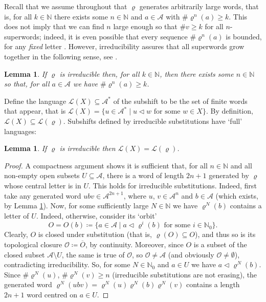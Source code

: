 \documentclass[11pt]{amsart}
\numberwithin{equation}{section}
\theoremstyle{plain}
\newtheorem{lemma}[theorem]{Lemma}
\theoremstyle{definition}
\newcommand{\N}{{\mathbb N}}
\newcommand{\mc}{\mathcal}
\newcommand{\A}{\mc A}
\newcommand{\sub}{\varrho}
\newcommand{\lang}{\mathcal{L}}
\begin{document}
Recall that we assume throughout that \(\sub\) generates arbitrarily large words, that is, for all \(k \in \N\) there exists some \(n \in \N\) and \(a \in \A\) with \(\# \sub^n(a) \geq k\). This does not imply that we can find \(n\) large enough so that \(\# v \geq k\) for all \(n\)-superwords; indeed, it is even possible that every sequence \(\# \sub^n(a)\) is bounded, for any \emph{fixed} letter \cite[Example 3.12]{MRW25}. However, irreducibility assures that all superwords grow together in the following sense, see \cite[Proposition 4.27]{MRW25}.

\begin{lemma}\label{lem:irreducible=>letter growth}
If \(\sub\) is irreducible then, for all \(k \in \N\), then there exists some \(n \in \N\) so that, for all \(a \in \A\) we have \(\# \sub^n(a) \geq k\).
\end{lemma}

Define the language \(\lang(X) \subseteq \A^\ast\) of the subshift to be the set of finite words that appear, that is \(\lang(X) = \{u \in \A^\ast \mid u \triangleleft w \text{ for some } w \in X\}\). By definition, \(\lang(X) \subseteq \lang(\sub)\). Subshifts defined by irreducible substitutions have `full' languages:

\begin{lemma}
If \(\sub\) is irreducible then \(\lang(X) = \lang(\sub)\).
\end{lemma}

\begin{proof}
A compactness argument \cite[Proposition 3.16]{MRW25} shows it is sufficient that, for all \(n \in \N\) and all non-empty open subsets \(U \subseteq \A\), there is a word of length \(2n+1\) generated by \(\sub\) whose central letter is in \(U\). This holds for irreducible substitutions. Indeed, first take any generated word \(u b v \in \A^{2n+1}\), where \(u\), \(v \in \A^n\) and \(b \in \A\) (which exists, by Lemma \ref{lem:irreducible=>letter growth}). Now, for some sufficiently large \(N \in \N\) we have \(\sub^N(b)\) contains a letter of \(U\). Indeed, otherwise, consider its `orbit'
\[
O = O(b) \coloneqq \{ a \in \A \mid a \triangleleft \sub^i(b) \text{ for some } i \in \N_0\} .
\]
Clearly, \(O\) is closed under substitution (that is, \(\sub(O) \subseteq O\)), and thus so is its topological closure \(\mathcal{O} \coloneqq \overline{O}\), by continuity. Moreover, since \(O\) is a subset of the closed subset \(\A \setminus U\), the same is true of \(\mathcal{O}\), so \(\mathcal{O} \neq \A\) (and obviously \(\mathcal{O} \neq \emptyset\)), contradicting irreducibility. So, for some \(N \in \N_0\) and \(a \in U\) we have \(a \triangleleft \sub^N(b)\). Since \(\# \sub^N(u)\), \(\# \sub^N(v) \geq n\) (irreducible substitutions are not erasing), the generated word \(\sub^N(ubv) = \sub^N(u) \sub^N(b) \sub^N(v)\) contains a length \(2n+1\) word centred on \(a \in U\).
\end{proof}
\end{document}
